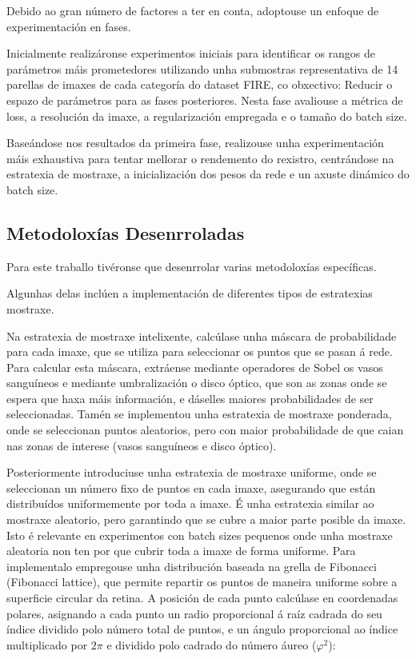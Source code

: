 Debido ao gran número de factores a ter en conta, adoptouse un enfoque de experimentación en fases.

Inicialmente realizáronse experimentos iniciais para identificar os rangos de parámetros máis prometedores utilizando unha submostras representativa de 14 parellas de imaxes de cada categoría do dataset FIRE, co obxectivo: Reducir o espazo de parámetros para as fases posteriores.
Nesta fase avaliouse a métrica de loss, a resolución da imaxe, a regularización empregada e o tamaño do batch size.

Baseándose nos resultados da primeira fase, realizouse unha experimentación máis exhaustiva para tentar mellorar o rendemento do rexistro, centrándose na estratexia de mostraxe, a inicialización dos pesos da rede e un axuste dinámico do batch size.

\subsection{Metodoloxías Desenrroladas}
\label{subsec:Metodoloxías Desenrroladas}

Para este traballo tivéronse que desenrrolar varias metodoloxías específicas. 

Algunhas delas inclúen a implementación de diferentes tipos de estratexias mostraxe.

Na estratexia de mostraxe intelixente, calcúlase unha máscara de probabilidade para cada imaxe, que se utiliza para seleccionar os puntos que se pasan á rede.
Para calcular esta máscara, extráense mediante operadores de Sobel os vasos sanguíneos e mediante umbralización o disco óptico, que son as zonas onde se espera que haxa máis información, e dáselles maiores probabilidades de ser seleccionadas.
Tamén se implementou unha estratexia de mostraxe ponderada, onde se seleccionan puntos aleatorios, pero con maior probabilidade de que caian nas zonas de interese (vasos sanguíneos e disco óptico).

Posteriormente introduciuse unha estratexia de mostraxe uniforme, onde se seleccionan un número fixo de puntos en cada imaxe, asegurando que están distribuídos uniformemente por toda a imaxe.
É unha estratexia similar ao mostraxe aleatorio, pero garantindo que se cubre a maior parte posible da imaxe. Isto é relevante en experimentos con batch sizes pequenos onde unha mostraxe aleatoria non ten por que cubrir toda a imaxe de forma uniforme.
Para implementalo empregouse unha distribución baseada na grella de Fibonacci (Fibonacci lattice), que permite repartir os puntos de maneira uniforme sobre a superficie circular da retina. 
A posición de cada punto calcúlase en coordenadas polares, asignando a cada punto un radio proporcional á raíz cadrada do seu índice dividido polo número total de puntos, e un ángulo proporcional ao índice multiplicado por $2\pi$ e dividido polo cadrado do número áureo ($\varphi^2$):

